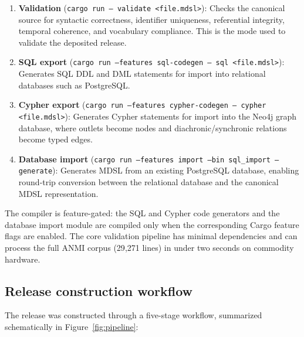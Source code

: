 \documentclass[11pt]{article}
\begin{document}
\begin{enumerate}
\item \textbf{Validation} (\texttt{cargo run -- validate <file.mdsl>}): Checks the canonical source for syntactic correctness, identifier uniqueness, referential integrity, temporal coherence, and vocabulary compliance. This is the mode used to validate the deposited release.

\item \textbf{SQL export} (\texttt{cargo run --features sql-codegen -- sql <file.mdsl>}): Generates SQL DDL and DML statements for import into relational databases such as PostgreSQL.

\item \textbf{Cypher export} (\texttt{cargo run --features cypher-codegen -- cypher <file.mdsl>}): Generates Cypher statements for import into the Neo4j graph database, where outlets become nodes and diachronic/synchronic relations become typed edges.

\item \textbf{Database import} (\texttt{cargo run --features import --bin sql\_import -- generate}): Generates MDSL from an existing PostgreSQL database, enabling round-trip conversion between the relational database and the canonical MDSL representation.
\end{enumerate}

The compiler is feature-gated: the SQL and Cypher code generators and the database import module are compiled only when the corresponding Cargo feature flags are enabled. The core validation pipeline has minimal dependencies and can process the full ANMI corpus (29{,}271 lines) in under two seconds on commodity hardware.

\subsection{Release construction workflow}

The release was constructed through a five-stage workflow, summarized schematically in Figure~\ref{fig:pipeline}:
\end{document}
